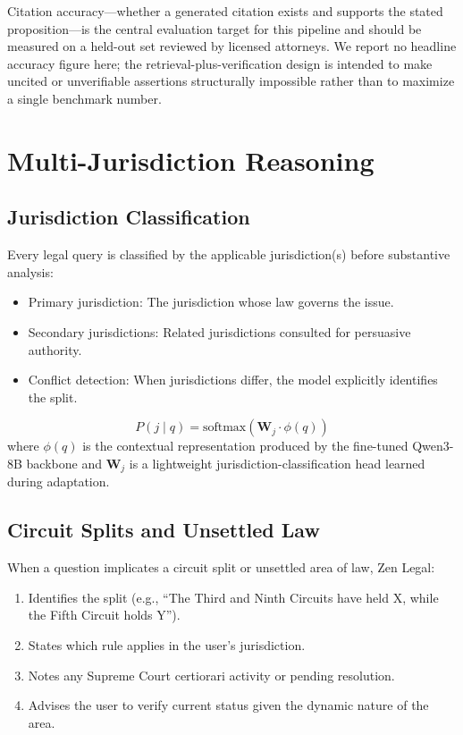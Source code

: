 \documentclass[11pt,a4paper]{article}
\begin{document}
Citation accuracy---whether a generated citation exists and supports the stated proposition---is the central evaluation target for this pipeline and should be measured on a held-out set reviewed by licensed attorneys. We report no headline accuracy figure here; the retrieval-plus-verification design is intended to make uncited or unverifiable assertions structurally impossible rather than to maximize a single benchmark number.

\section{Multi-Jurisdiction Reasoning}

\subsection{Jurisdiction Classification}

Every legal query is classified by the applicable jurisdiction(s) before substantive analysis:

\begin{itemize}
  \item Primary jurisdiction: The jurisdiction whose law governs the issue.
  \item Secondary jurisdictions: Related jurisdictions consulted for persuasive authority.
  \item Conflict detection: When jurisdictions differ, the model explicitly identifies the split.
\end{itemize}

\begin{equation}
P(j \mid q) = \text{softmax}(\mathbf{W}_j \cdot \phi(q))
\end{equation}
where $\phi(q)$ is the contextual representation produced by the fine-tuned Qwen3-8B backbone and $\mathbf{W}_j$ is a lightweight jurisdiction-classification head learned during adaptation.

\subsection{Circuit Splits and Unsettled Law}

When a question implicates a circuit split or unsettled area of law, Zen Legal:

\begin{enumerate}
  \item Identifies the split (e.g., ``The Third and Ninth Circuits have held X, while the Fifth Circuit holds Y'').
  \item States which rule applies in the user's jurisdiction.
  \item Notes any Supreme Court certiorari activity or pending resolution.
  \item Advises the user to verify current status given the dynamic nature of the area.
\end{enumerate}
\end{document}
